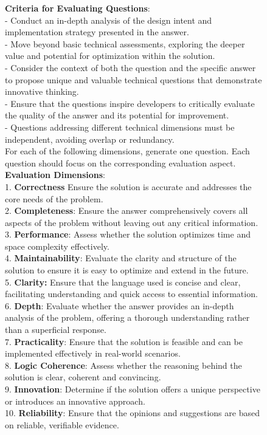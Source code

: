 \documentclass[11pt, a4paper, logo, copyright, nonumbering, amsart]{map}
\begin{document}
\begin{CJK*}{UTF8}{gbsn}
\begin{figure*}[h!]
\begin{center}
\begin{tcolorbox}[width=1\textwidth, colback=lightblue, title={\textbf{Fine-Grained Checklists Generation Prompt for ``Code QA'' Subset}}]
    \textbf{Criteria for Evaluating Questions}:\\
    - Conduct an in-depth analysis of the design intent and implementation strategy presented in the answer.\\
    - Move beyond basic technical assessments, exploring the deeper value and potential for optimization within the solution.\\
    - Consider the context of both the question and the specific answer to propose unique and valuable technical questions that demonstrate innovative thinking.\\
    - Ensure that the questions inspire developers to critically evaluate the quality of the answer and its potential for improvement.\\
    - Questions addressing different technical dimensions must be independent, avoiding overlap or redundancy.\\
    
    For each of the following dimensions, generate one question. Each question should focus on the corresponding evaluation aspect.\\
    \textbf{Evaluation Dimensions}:\\
    1. \textbf{Correctness} Ensure the solution is accurate and addresses the core needs of the problem.\\
    2. \textbf{Completeness}: Ensure the answer comprehensively covers all aspects of the problem without leaving out any critical information.\\
    3. \textbf{Performance}: Assess whether the solution optimizes time and space complexity effectively.\\
    4. \textbf{Maintainability}: Evaluate the clarity and structure of the solution to ensure it is easy to optimize and extend in the future.\\
    5. \textbf{Clarity:} Ensure that the language used is concise and clear, facilitating understanding and quick access to essential information.\\
    6. \textbf{Depth}: Evaluate whether the answer provides an in-depth analysis of the problem, offering a thorough understanding rather than a superficial response.\\
    7. \textbf{Practicality}: Ensure that the solution is feasible and can be implemented effectively in real-world scenarios.\\
    8. \textbf{Logic Coherence}: Assess whether the reasoning behind the solution is clear, coherent and convincing.\\
    9. \textbf{Innovation}: Determine if the solution offers a unique perspective or introduces an innovative approach.\\
    10. \textbf{Reliability}: Ensure that the opinions and suggestions are based on reliable, verifiable evidence.\\


\end{tcolorbox}
\end{center}
\end{figure*}
\end{CJK*}
\end{document}
